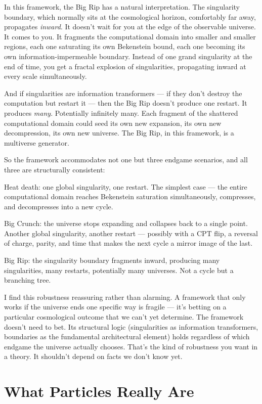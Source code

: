 \documentclass[11pt, twoside, openright]{book}
\begin{document}
In this framework, the Big Rip has a natural interpretation. The singularity boundary, which normally sits at the cosmological horizon, comfortably far away, propagates \textit{inward}. It doesn't wait for you at the edge of the observable universe. It comes to you. It fragments the computational domain into smaller and smaller regions, each one saturating its own Bekenstein bound, each one becoming its own information-impermeable boundary. Instead of one grand singularity at the end of time, you get a fractal explosion of singularities, propagating inward at every scale simultaneously.

And if singularities are information transformers --- if they don't destroy the computation but restart it --- then the Big Rip doesn't produce one restart. It produces \textit{many}. Potentially infinitely many. Each fragment of the shattered computational domain could seed its own new expansion, its own new decompression, its own new universe. The Big Rip, in this framework, is a multiverse generator.

So the framework accommodates not one but three endgame scenarios, and all three are structurally consistent:

Heat death: one global singularity, one restart. The simplest case --- the entire computational domain reaches Bekenstein saturation simultaneously, compresses, and decompresses into a new cycle.

Big Crunch: the universe stops expanding and collapses back to a single point. Another global singularity, another restart --- possibly with a CPT flip, a reversal of charge, parity, and time that makes the next cycle a mirror image of the last.

Big Rip: the singularity boundary fragments inward, producing many singularities, many restarts, potentially many universes. Not a cycle but a branching tree.

I find this robustness reassuring rather than alarming. A framework that only works if the universe ends one specific way is fragile --- it's betting on a particular cosmological outcome that we can't yet determine. The framework doesn't need to bet. Its structural logic (singularities as information transformers, boundaries as the fundamental architectural element) holds regardless of which endgame the universe actually chooses. That's the kind of robustness you want in a theory. It shouldn't depend on facts we don't know yet.


\section*{What Particles Really Are}
\end{document}
